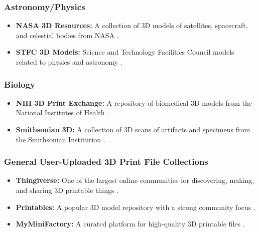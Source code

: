 \subsubsection{Astronomy/Physics}
\begin{itemize}
	\item \textbf{NASA 3D Resources:} A collection of 3D models of satellites, spacecraft, and celestial bodies from NASA \supercite{NASA3D}.
	\item \textbf{STFC 3D Models:} Science and Technology Facilities Council models related to physics and astronomy \supercite{STFC}.
\end{itemize}

\subsubsection{Biology}
\begin{itemize}
	\item \textbf{NIH 3D Print Exchange:} A repository of biomedical 3D models from the National Institutes of Health \supercite{NIH3D}.
	\item \textbf{Smithsonian 3D:} A collection of 3D scans of artifacts and specimens from the Smithsonian Institution \supercite{Smithsonian3D}.
\end{itemize}

\subsubsection{General User-Uploaded 3D Print File Collections}
\begin{itemize}
	\item \textbf{Thingiverse:} One of the largest online communities for discovering, making, and sharing 3D printable things \supercite{Thingiverse}.
	\item \textbf{Printables:} A popular 3D model repository with a strong community focus \supercite{Printables}.
	\item \textbf{MyMiniFactory:} A curated platform for high-quality 3D printable files \supercite{MyMiniFactory}.
\end{itemize}

